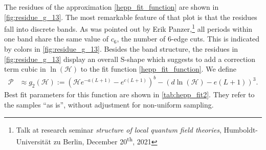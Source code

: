 \documentclass[12pt,a4paper]{article}
\newcommand{\period}{\mathcal P}
\renewcommand{\|}{\rule[-0.4ex]{0.2ex}{1.2em}}
\begin{document}
The residues of the approximation \cref{hepp_fit_function} are shown in \cref{fig:residue_g_13}. The most remarkable feature of that plot is that the residues fall into discrete bands. As was pointed out by Erik Panzer,\footnote{Talk at research seminar \emph{structure of local quantum field theories},  Humboldt-Universität zu Berlin, December 20\textsuperscript{th}, 2021} all periods within one band share the same value of $c_6$, the number of 6-edge cuts. This is  indicated by colors in \cref{fig:residue_g_13}.
Besides the band structure, the residues in \cref{fig:residue_g_13} display an overall S-shape which suggests to add a correction term cubic in $\ln(\mathcal H)$ to the fit function \cref{hepp_fit_function}. We define
\begin{align}\label{hepp_fit_function2}
	\period &\approx g_2(\mathcal H) := \left( \mathcal H e^{-a(L+1)} - e^{c(L+1)} \right) ^b - \left( d \ln (\mathcal H) -e (L+1) \right) ^3 .
\end{align}
Best fit parameters for this function are shown in \cref{tab:hepp_fit2}. They refer to the samples \enquote{as is}, without adjustment for non-uniform sampling.
\end{document}

